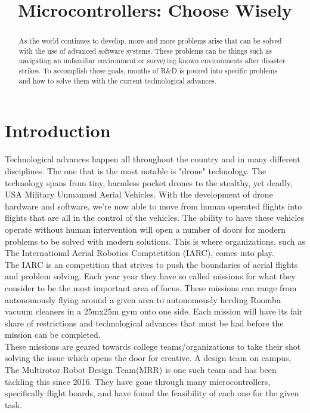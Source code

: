 \documentclass[conference,12pt, ]{IEEEtran}
\begin{document}
\title{Microcontrollers: Choose Wisely}

\author{
}


\maketitle

\doublespace
\begin{abstract}
As the world continues to develop, more and more problems arise that can be solved with the use of advanced software systems. These problems can be things such as navigating an unfamiliar environment or surveying known environments after disaster strikes. To accomplish these goals, months of R\&D is poured into specific problems and how to solve them with the current technological advances. 
\end{abstract}

\section{Introduction}
Technological advances happen all throughout the country and in many different disciplines. The one that is the most notable is "drone" technology. The technology spans from tiny, harmless pocket drones to the stealthy, yet deadly, USA Military Unmanned Aerial Vehicles. With the development of drone hardware and software, we're now able to move from human operated flights into flights that are all in the control of the vehicles. The ability to have these vehicles operate without human intervention will open a number of doors for modern problems to be solved with modern solutions. This is where organizations, such as The International Aerial Robotics Comptetition (IARC), comes into play.\\
The IARC is an competition that strives to push the boundaries of aerial flights and problem solving. Each year year they have so called missions for what they consider to be the most important area of focus. These missions can range from autonomously flying around a given area to autonomously herding Roomba vacuum cleaners in a 25mx25m gym onto one side. Each mission will have its fair share of restrictions and technological advances that must be had before the mission can be completed. \\
These missions are geared towards college teams/organizations to take their shot solving the issue which opens the door for creative. A design team on campus, The Multirotor Robot Design Team(MRR) is one such team and has been tackling this since 2016. They have gone through many microcontrollers, specifically flight boards, and have found the feasibility of each one for the given task.
\end{document}
